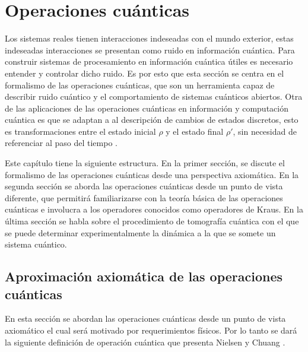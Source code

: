 \chapter{Operaciones cuánticas}\label{OpCuanticas}


Los sistemas reales tienen interacciones indeseadas con el mundo exterior, estas indeseadas interacciones se presentan como ruido en información cuántica. Para construir sistemas de procesamiento en información cuántica útiles es necesario entender y controlar dicho ruido. Es por esto que esta sección se centra en el formalismo de las operaciones cuánticas, que son un herramienta capaz de describir ruido cuántico y el comportamiento de sistemas cuánticos abiertos. Otra de las aplicaciones de las operaciones cuánticas en información y computación cuántica  es que se adaptan a al descripción de cambios de estados discretos, esto es transformaciones entre el estado inicial $\rho$ y el estado final $\rho'$, sin necesidad de referenciar al paso del tiempo {\cite{nielsen_chuang_2010}}.


Este capítulo tiene la siguiente estructura. En la primer sección, se discute el formalismo de las operaciones cuánticas desde una perspectiva axiomática. En la segunda sección se aborda las operaciones cuánticas desde un punto de vista diferente, que permitirá familiarizarse con la teoría básica de las operaciones cuánticas e involucra a los operadores conocidos como operadores de Kraus. En la última sección se habla sobre el procedimiento de tomografía cuántica con el que se puede determinar experimentalmente la dinámica a la que se somete un sistema cuántico.%

\section{Aproximación axiomática de las operaciones cuánticas}
En esta sección se abordan las operaciones cuánticas desde un punto de vista axiomático el cual será motivado por requerimientos físicos. Por lo tanto se dará la siguiente definición de operación cuántica que presenta Nielsen y Chuang {\cite{nielsen_chuang_2010}}.



